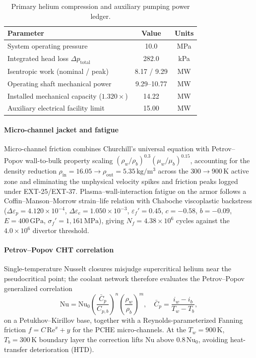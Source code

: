 \documentclass[11pt,journal,compsoc]{IEEEtran}
\begin{document}
\begin{table}[t]
\centering
\caption{Primary helium compression and auxiliary pumping power ledger.}
\label{tab:compressor}
\begin{tabular}{lcc}
\toprule
Parameter & Value & Units \\
\midrule
System operating pressure & 10.0 & MPa \\
Integrated head loss $\Delta p_{\mathrm{total}}$ & 282.0 & kPa \\
Isentropic work (nominal / peak) & 8.17 / 9.29 & MW \\
Operating shaft mechanical power & 9.29--10.77 & MW \\
Installed mechanical capacity ($1.320\times$) & 14.22 & MW \\
Auxiliary electrical facility limit & 15.00 & MW \\
\bottomrule
\end{tabular}
\end{table}

\paragraph{Micro-channel jacket and fatigue}
Micro-channel friction combines Churchill's universal equation with
Petrov--Popov wall-to-bulk property scaling $(\rho_w/\rho_b)^{0.3}
(\mu_w/\mu_b)^{0.15}$, accounting for the density reduction
$\rho_{\mathrm{in}} = 16.05 \to \rho_{\mathrm{out}} = 5.35\,
\mathrm{kg/m^3}$ across the $300 \to 900\,\mathrm{K}$ active zone and
eliminating the unphysical velocity spikes and friction peaks logged
under EXT-25/EXT-37. Plasma--wall-interaction fatigue on the armor follows a
Coffin--Manson--Morrow strain--life relation with Chaboche
viscoplastic backstress ($\Delta\varepsilon_p = 4.120\times10^{-4}$,
$\Delta\varepsilon_e = 1.050\times10^{-3}$, $\varepsilon_f' = 0.45$,
$c = -0.58$, $b = -0.09$, $E = 400\,\mathrm{GPa}$, $\sigma_f' =
1{,}161\,\mathrm{MPa}$), giving $N_f = 4.38\times10^{6}$ cycles
against the $4.0\times10^{6}$ divertor threshold.

\paragraph{Petrov--Popov CHT correlation}
Single-temperature Nusselt closures misjudge supercritical helium
near the pseudocritical point; the coolant network therefore
evaluates the Petrov--Popov generalized correlation
\begin{equation}
\mathrm{Nu} = \mathrm{Nu}_0
\left(\frac{\bar{C}_p}{C_{p,b}}\right)^{n}
\left(\frac{\rho_w}{\rho_b}\right)^{m},\quad
\bar{C}_p = \frac{i_w - i_b}{T_w - T_b},
\label{eq:pp}
\end{equation}
on a Petukhov--Kirillov base, together with a Reynolds-parameterized
Fanning friction $f = C\,\mathrm{Re}^{x} + y$ for the PCHE
micro-channels. At the $T_w = 900\,\mathrm{K}$, $T_b = 300\,\mathrm{K}$
boundary layer the correction lifts $\mathrm{Nu}$ above $0.8\,\mathrm{Nu}_0$,
avoiding heat-transfer deterioration (HTD).
\end{document}
